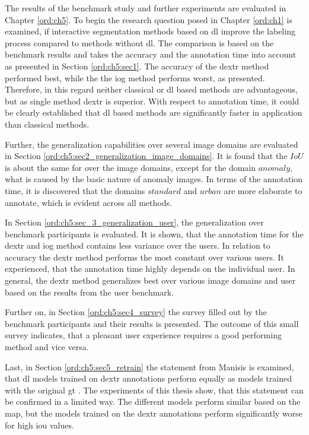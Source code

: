 The results of the benchmark study and further experiments are evaluated in Chapter \ref{ord:ch5}.
To begin the research question posed in Chapter \ref{ord:ch1} is examined, if interactive segmentation methods based on \gls{dl} improve the labeling process compared to methods without \gls{dl}.
The comparison is based on the benchmark results and takes the accuracy and the annotation time into account as presented in Section \ref{ord:ch5:sec1}.
The accuracy of the \gls{dextr} method performed best, while the the \gls{iog} method performs worst, as presented.
Therefore, in this regard neither classical or \gls{dl} based methods are advantageous, but as single method \gls{dextr} is superior.
With respect to annotation time, it could be clearly established that \gls{dl} based methods are significantly faster in application than classical methods.

Further, the generalization capabilities over several image domains are evaluated in Section \ref{ord:ch5:sec2_generalization_image_domains}.
It is found that the $ IoU $ is about the same for over the image domains, except for the domain $ anomaly $, what is caused by the basic nature of anomaly images.
In terms of the annotation time, it is discovered that the domains $ standard $ and $ urban $ are more elaborate to annotate, which is evident across all methods.

In Section \ref{ord:ch5:sec_3_generalization_user}, the generalization over benchmark participants is evaluated.
It is shown, that the annotation time for the \gls{dextr} and \gls{iog} method contains less variance over the users.
In relation to accuracy the \gls{dextr} method performs the most constant over various users.
It experienced, that the annotation time highly depends on the individual user.
In general, the \gls{dextr} method generalizes best over various image domains and user based on the results from the user benchmark.

Further on, in Section \ref{ord:ch5:sec4_survey} the survey filled out by the benchmark participants and their results is presented.
The outcome of this small survey indicates, that a pleasant user experience requires a good performing method and vice versa.

Last, in Section \ref{ord:ch5:sec5_retrain} the statement from Manisis \etal is examined, that \gls{dl} models trained on \gls{dextr} annotations perform equally as models trained with the original \gls{gt} \cite{Man18-DEXTR}.
The experiments of this thesis show, that this statement can be confirmed in a limited way.
The different models perform similar based on the \gls{map}, but the models trained on the \gls{dextr} annotations perform significantly worse for high \gls{iou} values. 


